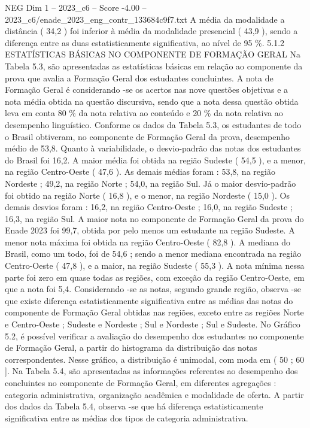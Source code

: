 \begin{textsample}{NEG Dim 1 – 2023\_c6 – Score -4.00 – 2023\_c6/enade\_2023\_eng\_contr\_133684c9f7.txt}
A média da modalidade a distância ( 34,2 ) foi inferior à média da modalidade presencial ( 43,9 ), sendo a diferença entre as duas estatisticamente significativa, ao nível de 95 \%. 5.1.2 ESTATÍSTICAS BÁSICAS NO COMPONENTE DE FORMAÇÃO GERAL Na Tabela 5.3, são apresentadas as estatísticas básicas em relação ao componente da prova que avalia a Formação Geral dos estudantes concluintes.
A nota de Formação Geral é considerando -se os acertos nas nove questões objetivas e a nota média obtida na questão discursiva, sendo que a nota dessa questão obtida leva em conta 80 \% da nota relativa ao conteúdo e 20 \% da nota relativa ao desempenho linguístico.
Conforme os dados da Tabela 5.3, os estudantes de todo o Brasil obtiveram, no componente de Formação Geral da prova, desempenho médio de 53,8.
Quanto à variabilidade, o desvio-padrão das notas dos estudantes do Brasil foi 16,2.
A maior média foi obtida na região Sudeste ( 54,5 ), e a menor, na região Centro-Oeste ( 47,6 ).
As demais médias foram : 53,8, na região Nordeste ; 49,2, na região Norte ; 54,0, na região Sul.
Já o maior desvio-padrão foi obtido na região Norte ( 16,8 ), e o menor, na região Nordeste ( 15,0 ).
Os demais desvios foram : 16,2, na região Centro-Oeste ; 16,0, na região Sudeste ; 16,3, na região Sul.
A maior nota no componente de Formação Geral da prova do Enade 2023 foi 99,7, obtida por pelo menos um estudante na região Sudeste.
A menor nota máxima foi obtida na região Centro-Oeste ( 82,8 ).
A mediana do Brasil, como um todo, foi de 54,6 ; sendo a menor mediana encontrada na região Centro-Oeste ( 47,8 ), e a maior, na região Sudeste ( 55,3 ).
A nota mínima nessa parte foi zero em quase todas as regiões, com exceção da região Centro-Oeste, em que a nota foi 5,4.
Considerando -se as notas, segundo grande região, observa -se que existe diferença estatisticamente significativa entre as médias das notas do componente de Formação Geral obtidas nas regiões, exceto entre as regiões Norte e Centro-Oeste ; Sudeste e Nordeste ; Sul e Nordeste ; Sul e Sudeste.
No Gráfico 5.2, é possível verificar a avaliação do desempenho dos estudantes no componente de Formação Geral, a partir do histograma da distribuição das notas correspondentes.
Nesse gráfico, a distribuição é unimodal, com moda em ( 50 ; 60 ].
Na Tabela 5.4, são apresentadas as informações referentes ao desempenho dos concluintes no componente de Formação Geral, em diferentes agregações : categoria administrativa, organização acadêmica e modalidade de oferta.
A partir dos dados da Tabela 5.4, observa -se que há diferença estatisticamente significativa entre as médias dos tipos de categoria administrativa.

\end{textsample}
